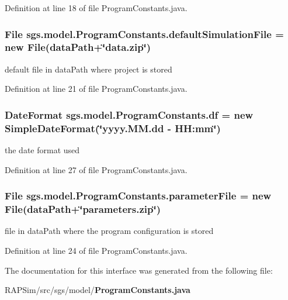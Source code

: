 Definition at line 18 of file Program\-Constants.\-java.

\subsubsection[{default\-Simulation\-File}]{\setlength{\rightskip}{0pt plus 5cm}File sgs.\-model.\-Program\-Constants.\-default\-Simulation\-File = new File({\bf data\-Path}+\char`\"{}data.\-zip\char`\"{})\hspace{0.3cm}{\ttfamily [static]}}\label{interfacesgs_1_1model_1_1_program_constants_a64287dfff902916ff17a687ac1ed4c17}
default file in data\-Path where project is stored 

Definition at line 21 of file Program\-Constants.\-java.

\subsubsection[{df}]{\setlength{\rightskip}{0pt plus 5cm}Date\-Format sgs.\-model.\-Program\-Constants.\-df = new Simple\-Date\-Format(\char`\"{}yyyy.\-M\-M.\-dd -\/ H\-H\-:mm\char`\"{})\hspace{0.3cm}{\ttfamily [static]}}\label{interfacesgs_1_1model_1_1_program_constants_af65041493f5d367a414ac1332085c3ad}
the date format used 

Definition at line 27 of file Program\-Constants.\-java.

\subsubsection[{parameter\-File}]{\setlength{\rightskip}{0pt plus 5cm}File sgs.\-model.\-Program\-Constants.\-parameter\-File = new File({\bf data\-Path}+\char`\"{}parameters.\-zip\char`\"{})\hspace{0.3cm}{\ttfamily [static]}}\label{interfacesgs_1_1model_1_1_program_constants_aa37cdb3ddd45fe8b1f4f37494a787a6e}
file in data\-Path where the program configuration is stored 

Definition at line 24 of file Program\-Constants.\-java.



The documentation for this interface was generated from the following file\-:\begin{DoxyCompactItemize}
\item 
R\-A\-P\-Sim/src/sgs/model/{\bf Program\-Constants.\-java}\end{DoxyCompactItemize}
